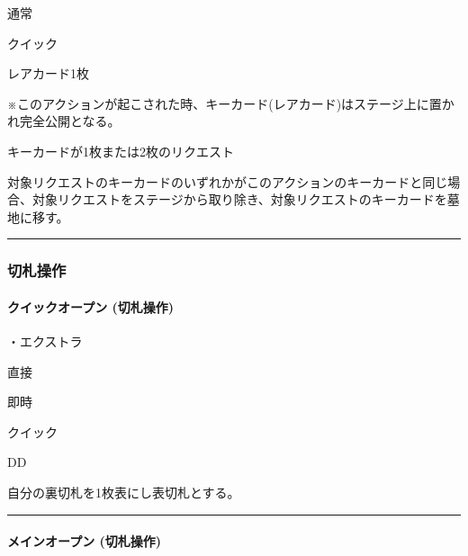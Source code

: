 \documentclass[letterpaper,10pt,dvipdfmx]{sphinxmanual}
\begin{document}
\sphinxAtStartPar
{} 通常

\sphinxAtStartPar
{} クイック

\sphinxAtStartPar
{} レアカード1枚

\sphinxAtStartPar
{} ※このアクションが起こされた時、キーカード(レアカード)はステージ上に置かれ完全公開となる。

\sphinxAtStartPar
{}

\sphinxAtStartPar
キーカードが1枚または2枚のリクエスト

\sphinxAtStartPar
{}

\sphinxAtStartPar
対象リクエストのキーカードのいずれかがこのアクションのキーカードと同じ場合、対象リクエストをステージから取り除き、対象リクエストのキーカードを墓地に移す。


\bigskip\hrule\bigskip



\subsubsection{切札操作}
\label{\detokenize{auto/frameActionlist:id9}}

\paragraph{クイックオープン (切札操作)}
\label{\detokenize{auto/frameActionlist:act-quickopen}}\label{\detokenize{auto/frameActionlist:id10}}
\sphinxAtStartPar
{}

\sphinxAtStartPar
・エクストラ

\sphinxAtStartPar
{} 直接

\sphinxAtStartPar
{} 即時

\sphinxAtStartPar
{} クイック

\sphinxAtStartPar
{} DD

\sphinxAtStartPar
{}

\sphinxAtStartPar
自分の裏切札を1枚表にし表切札とする。


\bigskip\hrule\bigskip



\paragraph{メインオープン (切札操作)}
\label{\detokenize{auto/frameActionlist:act-open}}\label{\detokenize{auto/frameActionlist:id11}}
\sphinxAtStartPar
{}
\end{document}
